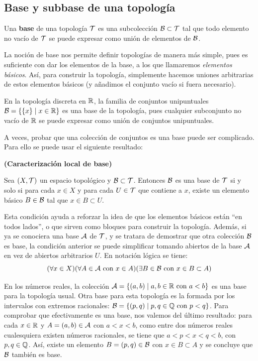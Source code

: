 \subsection*{Base y subbase de una topología}

\begin{deff}
    Una {\bf base} de una topología $\mathcal{T}$ es una subcolección $\mathcal{B} \subset \mathcal{T}$ tal que todo elemento no vacío de $\mathcal{T}$ se puede expresar como unión de elementos de $\mathcal{B}$.
\end{deff}

La noción de base nos permite definir topologías de manera más simple, pues es suficiente con dar los elementos de la base, a los que llamaremos \textit{elementos básicos}. Así, para construir la topología, simplemente hacemos uniones arbitrarias de estos elementos básicos (y añadimos el conjunto vacío si fuera necesario).

\begin{ej}
En la topología discreta en $\mathbb{R}$, la familia de conjuntos unipuntuales $\mathcal{B} = \{\{x\} \mid x\in \mathbb{R}\}$ es una base de la topología, pues cualquier subconjunto no vacío de $\mathbb{R}$ se puede expresar como unión de conjuntos unipuntuales.
\end{ej}

A veces, probar que una colección de conjuntos es una base puede ser complicado. Para ello se puede usar el siguiente resultado:

\begin{prop}
    {\bf (Caracterización local de base)}
    \item Sea $(X,\mathcal{T})$ un espacio topológico y $\mathcal{B}\subset\mathcal{T}$. Entonces $\mathcal{B}$ es una base de $\mathcal{T}$ si y solo si para cada $x \in X$ y para cada $U \in \mathcal{T}$ que contiene a $x$, existe un elemento básico $B\in \mathcal{B}$ tal que $x \in B \subset U$.
\end{prop}

 Esta condición ayuda a reforzar la idea de que los elementos básicos están ``en todos lados'', o que sirven como bloques para construir la topología. Además, si ya se conociera una base $\mathcal{A}$ de $\mathcal{T}$, y se tratara de demostrar que otra colección $\mathcal{B}$ es base, la condición anterior se puede simplificar tomando abiertos de la base $\mathcal{A}$ en vez de abiertos arbitrarios $U$. En notación lógica se tiene:
    \[(\forall x \in X) (\forall A \in \mathcal{A} \text{ con } x \in A) (\exists B\in \mathcal{B} \text{ con } x \in B \subset A)\]
     

\begin{ej}
    En los números reales, la colección $\mathcal{A} = \{(a,b) \mid a,b \in \mathbb{R} \text{ con } a < b\}$ es una base para la topología usual. Otra base para esta topología es la formada por los intervalos con extremos racionales: $\mathcal{B} = \{(p,q) \mid p,q \in \mathbb{Q} \text{ con } p < q\}$. Para comprobar que efectivamente es una base, nos valemos del último resultado: para cada $x \in \mathbb{R}$ y $A = (a,b) \in \mathcal{A}$ con $a < x < b$, como entre dos números reales cualesquiera existen números racionales, se tiene que $ a < p < x < q < b$, con $p,q \in \mathbb{Q}$. Así, existe un elemento $B = (p,q) \in \mathcal{B}$ con $x \in B \subset A$ y se concluye que $\mathcal{B}$ también es base.
\end{ej}

